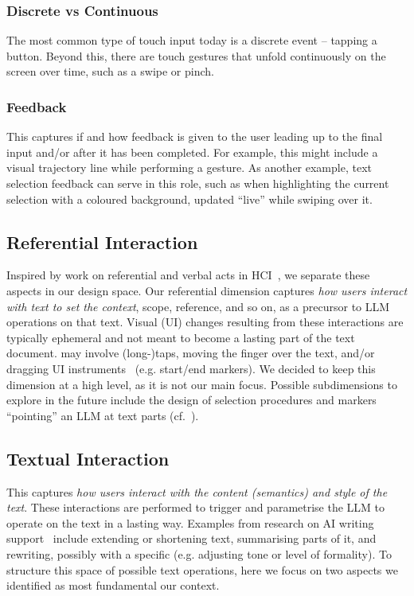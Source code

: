 \subsubsection{Discrete vs Continuous}
The most common type of touch input today is a discrete event -- tapping a button. Beyond this, there are touch gestures that unfold continuously on the screen over time, such as a swipe or pinch.

\subsubsection{Feedback} 
This captures if and how feedback is given to the user leading up to the final input and/or after it has been completed. For example, this might include a visual trajectory line while performing a gesture. As another example, text selection feedback can serve in this role, such as when highlighting the current selection with a coloured background, updated ``live'' while swiping over it.



\subsection{Referential Interaction} 
Inspired by work on referential and verbal acts in HCI~\cite{wolff1998acting}, we separate these aspects in our design space. Our referential dimension captures \textit{how users interact with text to set the context}, scope, reference, and so on, as a precursor to LLM operations on that text. Visual (UI) changes resulting from these interactions are typically ephemeral and not meant to become a lasting part of the text document.
 may involve (long-)taps, moving the finger over the text, and/or dragging UI instruments~\cite{BeaudouinLafon2000instrumental} (e.g. start/end markers). We decided to keep this dimension at a high level, as it is not our main focus. Possible subdimensions to explore in the future include the design of selection procedures and markers  ``pointing'' an LLM at text parts (cf.~\cite{directGPT}).


\subsection{Textual Interaction}
This captures \textit{how users interact with the content (semantics) and style of the text}. These interactions are performed to trigger and parametrise the LLM to operate on the text in a lasting way.
Examples from research on AI writing support~\cite{Lee2024dsiiwa} include extending or shortening text, summarising parts of it, and rewriting, possibly with a specific  (e.g. adjusting tone or level of formality).
To structure this space of possible  text operations, here we focus on two aspects we identified as most fundamental  our context.

